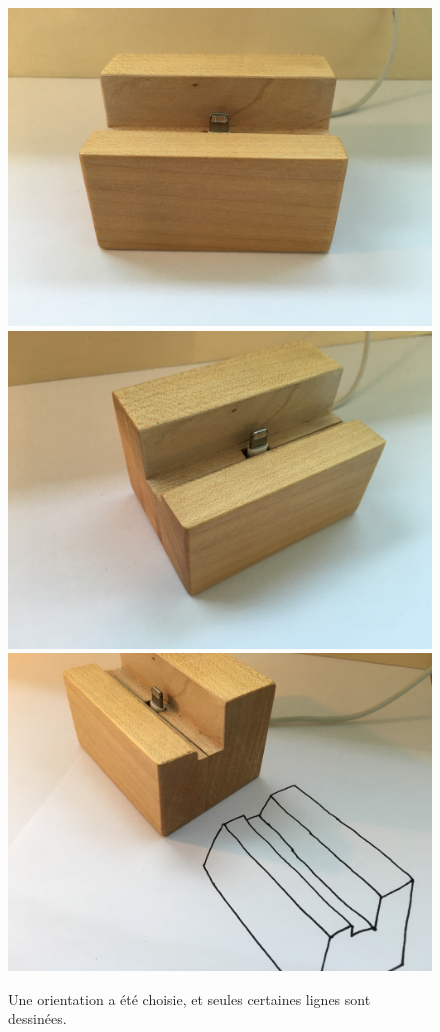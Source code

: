 \documentclass[12pt, a4paper, oneside]{article}
\begin{document}
\begin{figure}
    \begin{center}
        \null\hfill
        \includegraphics[scale=0.038]{images/dock1.jpg}\hfill
        \includegraphics[scale=0.038]{images/dock2.jpg}\hfill
        \includegraphics[scale=0.038]{images/dock3.jpg}\hfill\null{}
        \caption{Une orientation a été choisie, et seules certaines lignes sont dessinées.\label{img:croquis-exemple}}
    \end{center}
\end{figure}
\end{document}
